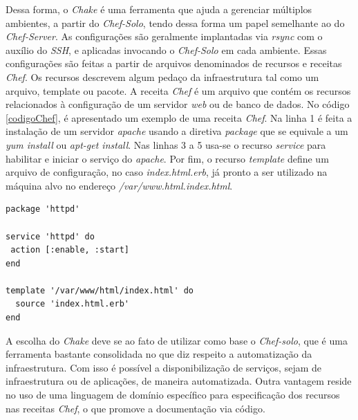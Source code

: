Dessa forma, o \textit{Chake} é uma ferramenta que ajuda a gerenciar múltiplos ambientes, a partir do \textit{Chef-Solo}, tendo dessa forma um papel semelhante ao do \textit{Chef-Server}. As configurações são geralmente implantadas via \textit{rsync} com o auxílio do \textit{SSH}, e aplicadas invocando o \textit{Chef-Solo} em cada ambiente. Essas configurações são feitas a partir de arquivos denominados de recursos e receitas \textit{Chef}. Os recursos descrevem algum pedaço da infraestrutura tal como um arquivo, template ou pacote. A receita \textit{Chef} é um arquivo que contém os recursos relacionados à configuração de um servidor \textit{web} ou de banco de dados. No código \ref{codigoChef}, é apresentado um exemplo de uma receita \textit{Chef}. Na linha 1 é feita a instalação de um servidor \textit{apache} usando a diretiva \textit{package} que se equivale a um \textit{yum install} ou \textit{apt-get install}. Nas linhas 3 a 5 usa-se o recurso \textit{service} para habilitar e iniciar o serviço do \textit{apache}. Por fim, o recurso \textit{template} define um arquivo de configuração, no caso \textit{index.html.erb}, já pronto a ser utilizado na máquina alvo no endereço \textit{/var/www.html.index.html}.

\begin{lstlisting}[caption={Código exemplo de uma receita Chef}, label=codigoChef]
package 'httpd'

service 'httpd' do
 action [:enable, :start]
end

template '/var/www/html/index.html' do
  source 'index.html.erb'
end
\end{lstlisting}

A escolha do \textit{Chake} deve se ao fato de utilizar como base o \textit{Chef-solo}, que é uma ferramenta bastante consolidada no que diz respeito a automatização da infraestrutura. Com isso é possível a disponibilização de serviços, sejam de infraestrutura ou de aplicações, de maneira automatizada. Outra vantagem reside no uso de uma linguagem de domínio específico para especificação dos recursos nas receitas \textit{Chef}, o que promove a documentação via código.

